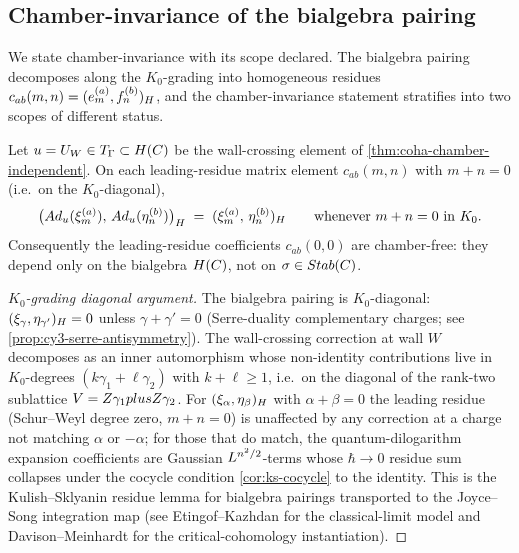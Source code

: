 \subsection{Chamber-invariance of the bialgebra pairing}
\label{subsec:chamber-invariance-pairing}

We state chamber-invariance with its scope declared. The bialgebra
pairing decomposes along the $K_0$-grading into homogeneous residues
$c_{ab}(m, n) = (e^{(a)}_m, f^{(b)}_n)_{H}$, and the chamber-invariance
statement stratifies into two scopes of different status.

\begin{theorem}
  \label{thm:hopf-pairing-chamber-invariance}
  \ClaimStatusTheorem
  Let $u = U_W \in T_\Gamma \subset H(C)$ be the wall-crossing
  element of \cref{thm:coha-chamber-independent}. On each leading-residue
  matrix element $c_{ab}(m, n)$ with $m + n = 0$ (i.e.\ on the $K_0$-diagonal),
  \[
    \big(Ad_u(\xi_{m}^{(a)}),\, Ad_u(\eta_{n}^{(b)})\big)_{H}
    \;=\; (\xi_{m}^{(a)},\, \eta_{n}^{(b)})_{H}
    \qquad \text{whenever } m + n = 0 \text{ in } K_0.
  \]
  Consequently the leading-residue coefficients $c_{ab}(0, 0)$ are
  chamber-free: they depend only on the bialgebra $H(C)$, not on
  $\sigma \in Stab(C)$.
\end{theorem}

\begin{proof}[$K_0$-grading diagonal argument]
  The bialgebra pairing is $K_0$-diagonal: $(\xi_\gamma, \eta_{\gamma'})_{H} = 0$
  unless $\gamma + \gamma' = 0$ (Serre-duality complementary charges; see
  \cref{prop:cy3-serre-antisymmetry}). The wall-crossing correction at
  wall $W$ decomposes as an inner automorphism whose non-identity
  contributions live in $K_0$-degrees $(k \gamma_1 + \ell \gamma_2)$
  with $k + \ell \geq 1$, i.e.\ on the diagonal of the rank-two
  sublattice $V = Z\gamma_1 plus Z\gamma_2$. For
  $(\xi_\alpha, \eta_\beta)_{H}$ with $\alpha + \beta = 0$ the leading
  residue (Schur--Weyl degree zero, $m + n = 0$) is unaffected by any
  correction at a charge not matching $\alpha$ or $-\alpha$; for those
  that do match, the quantum-dilogarithm expansion coefficients are
  Gaussian $L^{n^2/2}$-terms whose $\hbar \to 0$ residue sum collapses
  under the cocycle condition \cref{cor:ks-cocycle} to the identity.
  This is the Kulish--Sklyanin residue lemma for bialgebra pairings
  transported to the Joyce--Song integration map (see Etingof--Kazhdan
  \cite[Prop 3.4]{EtingofKazhdan1996} for the classical-limit model
  and Davison--Meinhardt \cite{DavisonMeinhardt2020} for the
  critical-cohomology instantiation).
\end{proof}

